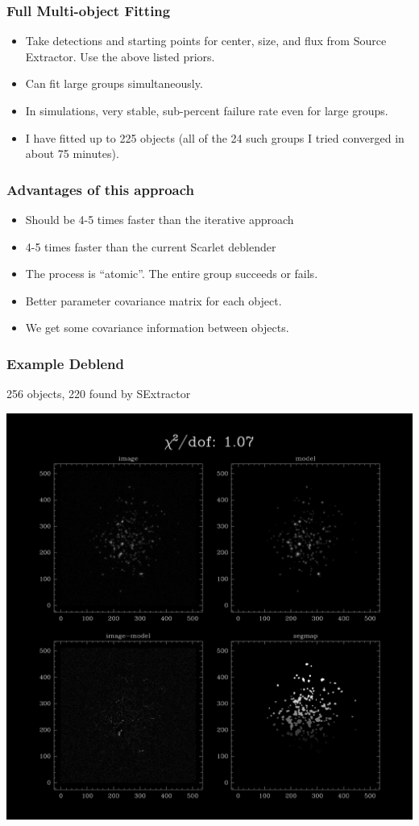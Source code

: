 \documentclass{beamer}
\begin{document}
\frame
{
    \frametitle{Full Multi-object Fitting}

    \begin{itemize}

        \item Take detections and starting points for
            center, size, and flux from Source Extractor.  Use the
            above listed priors.
            
        \item Can fit large groups simultaneously.

        \item In simulations, very stable, sub-percent failure rate
            even for large groups.

        \item I have fitted up to 225 objects (all of the 24 such groups I tried converged
            in about 75 minutes).


    \end{itemize}

}
\frame
{
    \frametitle{Advantages of this approach}

    \begin{itemize}

        \item Should be 4-5 times faster than the iterative approach

        \item 4-5 times faster than the current Scarlet deblender

        \item The process is ``atomic''.  The entire group succeeds or fails.

        \item Better parameter covariance matrix for each object.

        \item We get some covariance information between objects.

    \end{itemize}
}

\frame
{
    \frametitle{Example Deblend}

        256 objects, 220 found by SExtractor
    \begin{center}
        \includegraphics[width=0.7\columnwidth]{diff-20855-000000.png}
    \end{center}
}
\end{document}
